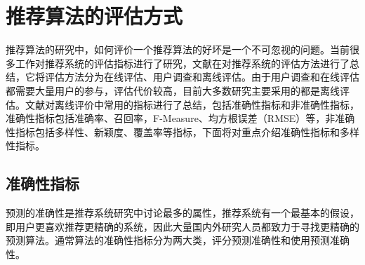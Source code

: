\documentclass[master,winfonts]{njuthesis}
\begin{document}
\section{推荐算法的评估方式}
推荐算法的研究中，如何评价一个推荐算法的好坏是一个不可忽视的问题。当前很多工作对推荐系统的评估指标进行了研究，文献\cite{Sarwar2001Item,朱郁筱2012推荐系统评价指标综述}在对推荐系统的评估方法进行了总结，它将评估方法分为在线评估、用户调查和离线评估。由于用户调查和在线评估都需要大量用户的参与，评估代价较高，目前大多数研究主要采用的都是离线评估。文献\cite{朱郁筱2012推荐系统评价指标综述}对离线评价中常用的指标进行了总结，包括准确性指标和非准确性指标，准确性指标包括准确率、召回率，F-Measure、均方根误差（RMSE）等，非准确性指标包括多样性、新颖度、覆盖率等指标，下面将对重点介绍准确性指标和多样性指标。

\subsection{准确性指标}
预测的准确性是推荐系统研究中讨论最多的属性，推荐系统有一个最基本的假设，即用户更喜欢推荐更精确的系统，因此大量国内外研究人员都致力于寻找更精确的预测算法。通常算法的准确性指标分为两大类，评分预测准确性和使用预测准确性。
\end{document}
